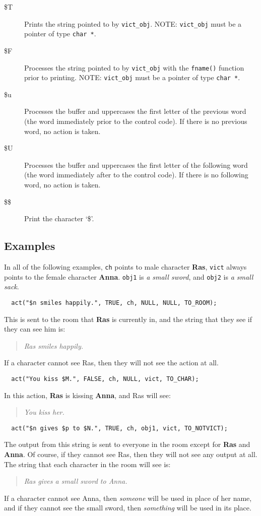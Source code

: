 \documentclass[11pt]{article}
\begin{document}
\begin{description}
\item[\$T] Prints the string pointed to by \texttt{vict\_obj}.  NOTE: \texttt{vict\_obj} must be a pointer of type \texttt{char~*}.
\item[\$F] Processes the string pointed to by \texttt{vict\_obj} with the \texttt{fname()} function prior to printing. NOTE: \texttt{vict\_obj} must be a pointer of type \texttt{char~*}.
\item[\$u] Processes the buffer and uppercases the first letter of the previous word (the word immediately prior to the control code).  If there is no previous word, no action is taken.
 \item[\$U] Processes the buffer and uppercases the first letter of the following word (the word immediately after to the control code).  If there is no following word, no action is taken.
\item[\$\$] Print the character `\$'.
\end{description}

\subsection{Examples}\label{examples}
In all of the following examples, \texttt{ch} points to male character {\bf Ras}, \texttt{vict} always points to the female character {\bf Anna}.  \texttt{obj1} is {\it a small sword}, and \texttt{obj2} is {\it a small sack}.

\begin{verbatim}
  act("$n smiles happily.", TRUE, ch, NULL, NULL, TO_ROOM);
\end{verbatim}
This is sent to the room that {\bf Ras} is currently in, and the string that they see if they can see him is:
\begin{quote}
{\em Ras smiles happily.}
\end{quote}
If a character cannot see Ras, then they will not see the action at all.

\begin{verbatim}
  act("You kiss $M.", FALSE, ch, NULL, vict, TO_CHAR);
\end{verbatim}
In this action, {\bf Ras} is kissing {\bf Anna}, and Ras will see:
\begin{quote}
{\em You kiss her.}
\end{quote}

\begin{verbatim}
  act("$n gives $p to $N.", TRUE, ch, obj1, vict, TO_NOTVICT);
\end{verbatim}
The output from this string is sent to everyone in the room except for {\bf Ras} and {\bf Anna}.  Of course, if they cannot see Ras, then they will not see any output at all.  The string that each character in the room will see is:
\begin{quote}
{\em Ras gives a small sword to Anna.}
\end{quote}
If a character cannot see Anna, then {\it someone} will be used in place of her name, and if they cannot see the small sword, then {\it something} will be used in its place.
\end{document}
